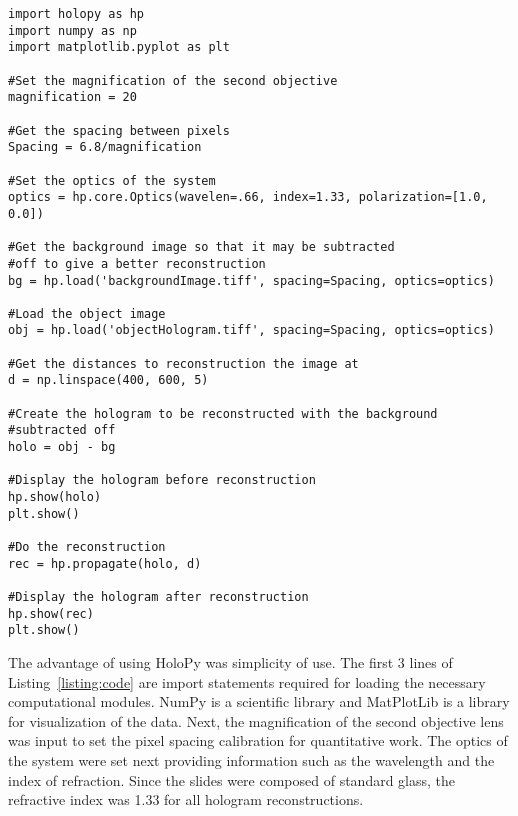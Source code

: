 \begin{Code}[scale=0.75,htbp!]
    \centering
\begin{lstlisting}[caption=Code for a general reconstruction, label=listing:code]
import holopy as hp
import numpy as np
import matplotlib.pyplot as plt

#Set the magnification of the second objective
magnification = 20

#Get the spacing between pixels
Spacing = 6.8/magnification

#Set the optics of the system
optics = hp.core.Optics(wavelen=.66, index=1.33, polarization=[1.0, 0.0])

#Get the background image so that it may be subtracted 
#off to give a better reconstruction
bg = hp.load('backgroundImage.tiff', spacing=Spacing, optics=optics)

#Load the object image
obj = hp.load('objectHologram.tiff', spacing=Spacing, optics=optics)

#Get the distances to reconstruction the image at
d = np.linspace(400, 600, 5)

#Create the hologram to be reconstructed with the background 
#subtracted off
holo = obj - bg

#Display the hologram before reconstruction
hp.show(holo)
plt.show()

#Do the reconstruction
rec = hp.propagate(holo, d)

#Display the hologram after reconstruction
hp.show(rec)
plt.show()

\end{lstlisting}
\end{Code}

The advantage of using HoloPy was simplicity of use. The first 3
lines of Listing~\ref{listing:code} are import statements required for loading
the necessary computational modules.
NumPy is a scientific library and MatPlotLib is a
library 
for visualization of the data. Next, the magnification
of the second objective lens was input
to set the pixel spacing
calibration for quantitative work.
The optics of the system were set next providing
information such as the wavelength and the index of
refraction. Since the slides were composed of standard glass, the refractive
index was 1.33 for all hologram reconstructions.

